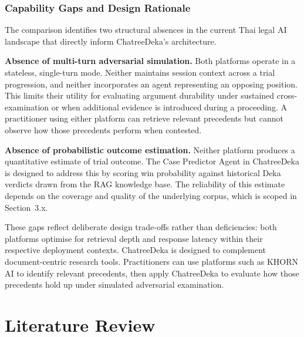 \subsubsection{Capability Gaps and Design Rationale}

The comparison identifies two structural absences in the current Thai legal AI landscape
that directly inform ChatreeDeka's architecture.

\textbf{Absence of multi-turn adversarial simulation.} Both platforms operate in a
stateless, single-turn mode. Neither maintains session context across a trial progression,
and neither incorporates an agent representing an opposing position. This limits their
utility for evaluating argument durability under sustained cross-examination or when
additional evidence is introduced during a proceeding. A practitioner using either
platform can retrieve relevant precedents but cannot observe how those precedents perform
when contested.

\textbf{Absence of probabilistic outcome estimation.} Neither platform produces a
quantitative estimate of trial outcome. The Case Predictor Agent in ChatreeDeka is
designed to address this by scoring win probability against historical Deka verdicts drawn
from the RAG knowledge base. The reliability of this estimate depends on the coverage and
quality of the underlying corpus, which is scoped in Section~3.x.

These gaps reflect deliberate design trade-offs rather than deficiencies: both platforms
optimise for retrieval depth and response latency within their respective deployment
contexts. ChatreeDeka is designed to complement document-centric research tools.
Practitioners can use platforms such as KHORN AI to identify relevant precedents, then
apply ChatreeDeka to evaluate how those precedents hold up under simulated adversarial
examination.

\section{Literature Review}
\label{section:literature-review}




